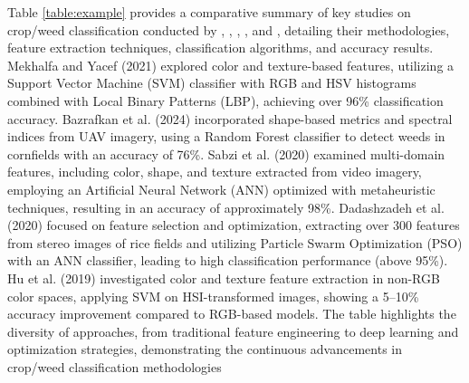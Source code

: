 \documentclass[letterpaper]{report}
\begin{document}
Table \ref{table:example} provides a comparative summary of key studies on crop/weed classification conducted by \cite{Mekhalfa2021-np},  \cite{Bazrafkan2024-bl}, \cite{Sabzi2020-af}, \cite{Dadashzadeh2020-pa}, and \cite{Hu2024-nv}, detailing their methodologies, feature extraction techniques, classification algorithms, and accuracy results. Mekhalfa and Yacef (2021) explored color and texture-based features, utilizing a Support Vector Machine (SVM) classifier with RGB and HSV histograms combined with Local Binary Patterns (LBP), achieving over 96\% classification accuracy. Bazrafkan et al. (2024) incorporated shape-based metrics and spectral indices from UAV imagery, using a Random Forest classifier to detect weeds in cornfields with an accuracy of 76\%. Sabzi et al. (2020) examined multi-domain features, including color, shape, and texture extracted from video imagery, employing an Artificial Neural Network (ANN) optimized with metaheuristic techniques, resulting in an accuracy of approximately 98\%. Dadashzadeh et al. (2020) focused on feature selection and optimization, extracting over 300 features from stereo images of rice fields and utilizing Particle Swarm Optimization (PSO) with an ANN classifier, leading to high classification performance (above 95\%). Hu et al. (2019) investigated color and texture feature extraction in non-RGB color spaces, applying SVM on HSI-transformed images, showing a 5–10\% accuracy improvement compared to RGB-based models. The table highlights the diversity of approaches, from traditional feature engineering to deep learning and optimization strategies, demonstrating the continuous advancements in crop/weed classification methodologies
\end{document}
